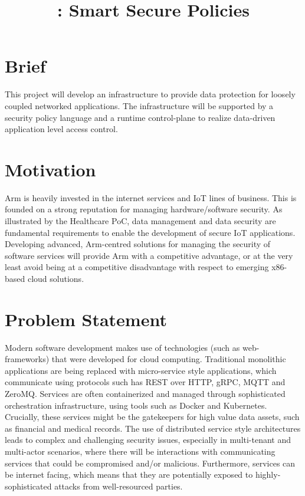 \documentclass[a4paper%
]{article}
\title{\armour{}: Smart Secure Policies}
\date{}
\begin{document}
\maketitle

\section{Brief}

This project will develop an infrastructure to provide data protection
for loosely coupled networked applications.
%
The infrastructure will be supported by a security policy language and
a runtime control-plane to realize data-driven application level
access control.

\section{Motivation}

Arm is heavily invested in the internet services and IoT lines of
business.
%
This is founded on a strong reputation for managing hardware/software
security.
%
As illustrated by the Healthcare PoC, data management and data
security are fundamental requirements to enable the development of
secure IoT applications.
%
Developing advanced, Arm-centred solutions for managing the security
of software services will provide Arm with a competitive advantage, or
at the very least avoid being at a competitive disadvantage with
respect to emerging x86-based cloud solutions.


\section{Problem Statement}

Modern software development makes use of technologies (such as
web-frameworks) that were developed for cloud computing.
%
Traditional monolithic applications are being replaced with
micro-service style applications, which communicate using protocols
such has REST over HTTP, gRPC, MQTT and ZeroMQ.
%
Services are often containerized and managed through sophisticated
orchestration infrastructure, using tools such as Docker and
Kubernetes.
%
Crucially, these services might be the gatekeepers for high value data
assets, such as financial and medical records.
%
The use of distributed service style architectures leads to complex
and challenging security issues, especially in multi-tenant and
multi-actor scenarios, where there will be interactions with
communicating services that could be compromised and/or malicious.
%
Furthermore, services can be internet facing, which means that they
are potentially exposed to highly-sophisticated attacks from
well-resourced parties.
\end{document}
